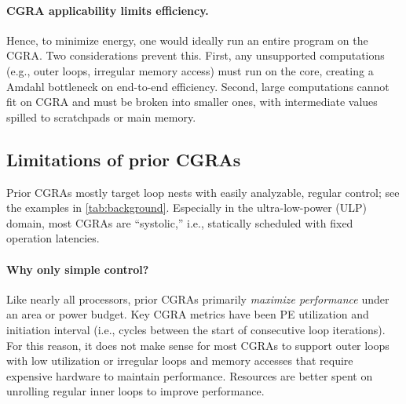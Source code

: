 
\paragraph{CGRA applicability limits efficiency.}
Hence, to minimize energy, one would ideally run an entire program on the CGRA.
%
Two considerations prevent this.
%
First, any unsupported computations (e.g., outer loops, irregular memory access)
must run on the core, creating a Amdahl bottleneck on end-to-end
efficiency.
%
Second, large computations cannot fit on CGRA and must be broken
into smaller ones, with intermediate values spilled to scratchpads or main memory.


\subsection{Limitations of prior CGRAs}

Prior CGRAs mostly target loop nests with easily analyzable, regular control;
see the examples in \autoref{tab:background}.
%
Especially in the ultra-low-power (ULP) domain, 
most CGRAs are ``systolic,'' i.e., statically
scheduled with fixed operation latencies.

\paragraph{Why only simple control?}
Like nearly all processors, prior CGRAs primarily \emph{maximize
performance} under an area or power budget.
%
Key CGRA metrics have been PE utilization and initiation interval
(i.e., cycles between the start of consecutive loop iterations).
%
For this reason, it does not make sense for most CGRAs to support
outer loops with low utilization
or irregular loops and memory accesses that require expensive hardware to maintain performance.
%
Resources are better spent on unrolling regular inner loops to improve performance. %

